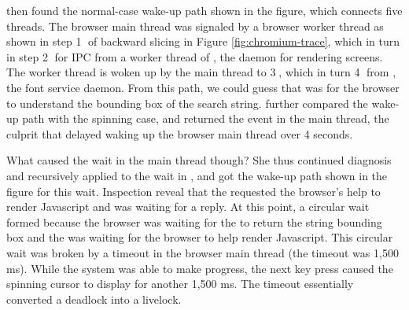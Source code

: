 \xxx then found the normal-case wake-up path shown in the figure, which
connects five threads.  The browser main thread was signaled by a browser
worker thread as shown in step \textcircled{1} of backward slicing in Figure
\ref{fig:chromium-trace}, which in turn  in step \textcircled{2}
for IPC from a worker thread of , the daemon for rendering screens.
The  worker thread is woken up by the  main thread to
 \textcircled{3}, which in turn  \textcircled{4}
from , the font service daemon.  From this path, we could guess that
 was for the browser to understand the bounding box of
the search string.  \xxx further compared the wake-up path with the spinning
case, and returned the  event in the  main
thread, the culprit that delayed waking up the browser main thread over 4
seconds.

What caused the wait in the  main thread though?  She thus
continued diagnosis and recursively applied \xxx to the wait in ,
and got the wake-up path shown in the figure for this wait.  Inspection reveal
that the  requested the browser's help to render Javascript and was
waiting for a reply.  At this point, a circular wait formed because the browser
was waiting for the  to return the string bounding box and the
 was waiting for the browser to help render Javascript.  This
circular wait was broken by a timeout in the browser main thread (the
 timeout was 1,500 ms).  While the system was able to make
progress, the next key press caused the spinning cursor to display for another
1,500 ms.  The timeout essentially converted a deadlock into a livelock.

